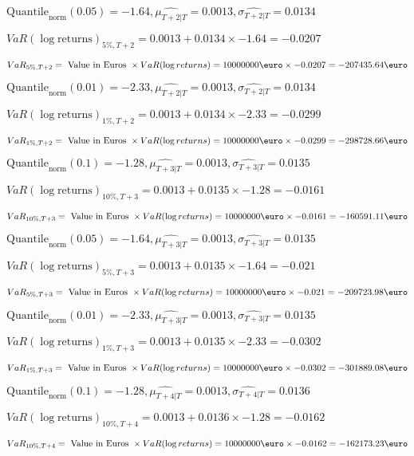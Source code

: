 $\text{Quantile}_\text{norm}(0.05) = -1.64,\hat{\mu_{T+2|T}} = 0.0013, \hat{\sigma_{T+2|T}} = 0.0134$

$VaR(\log \text{returns})_{5\%, T + 2} = 0.0013 + 0.0134\times-1.64 = -0.0207$

$VaR_{5\%, T + 2} = \text{ Value in Euros } \times VaR(\log returns) = 10 000 000 \text{\euro} \times-0.0207 = -207435.64 \text{\euro}$


$\text{Quantile}_\text{norm}(0.01) = -2.33,\hat{\mu_{T+2|T}} = 0.0013, \hat{\sigma_{T+2|T}} = 0.0134$

$VaR(\log \text{returns})_{1\%, T + 2} = 0.0013 + 0.0134\times-2.33 = -0.0299$

$VaR_{1\%, T + 2} = \text{ Value in Euros } \times VaR(\log returns) = 10 000 000 \text{\euro} \times-0.0299 = -298728.66 \text{\euro}$


$\text{Quantile}_\text{norm}(0.1) = -1.28,\hat{\mu_{T+3|T}} = 0.0013, \hat{\sigma_{T+3|T}} = 0.0135$

$VaR(\log \text{returns})_{10\%, T + 3} = 0.0013 + 0.0135\times-1.28 = -0.0161$

$VaR_{10\%, T + 3} = \text{ Value in Euros } \times VaR(\log returns) = 10 000 000 \text{\euro} \times-0.0161 = -160591.11 \text{\euro}$


$\text{Quantile}_\text{norm}(0.05) = -1.64,\hat{\mu_{T+3|T}} = 0.0013, \hat{\sigma_{T+3|T}} = 0.0135$

$VaR(\log \text{returns})_{5\%, T + 3} = 0.0013 + 0.0135\times-1.64 = -0.021$

$VaR_{5\%, T + 3} = \text{ Value in Euros } \times VaR(\log returns) = 10 000 000 \text{\euro} \times-0.021 = -209723.98 \text{\euro}$


$\text{Quantile}_\text{norm}(0.01) = -2.33,\hat{\mu_{T+3|T}} = 0.0013, \hat{\sigma_{T+3|T}} = 0.0135$

$VaR(\log \text{returns})_{1\%, T + 3} = 0.0013 + 0.0135\times-2.33 = -0.0302$

$VaR_{1\%, T + 3} = \text{ Value in Euros } \times VaR(\log returns) = 10 000 000 \text{\euro} \times-0.0302 = -301889.08 \text{\euro}$


$\text{Quantile}_\text{norm}(0.1) = -1.28,\hat{\mu_{T+4|T}} = 0.0013, \hat{\sigma_{T+4|T}} = 0.0136$

$VaR(\log \text{returns})_{10\%, T + 4} = 0.0013 + 0.0136\times-1.28 = -0.0162$

$VaR_{10\%, T + 4} = \text{ Value in Euros } \times VaR(\log returns) = 10 000 000 \text{\euro} \times-0.0162 = -162173.23 \text{\euro}$


